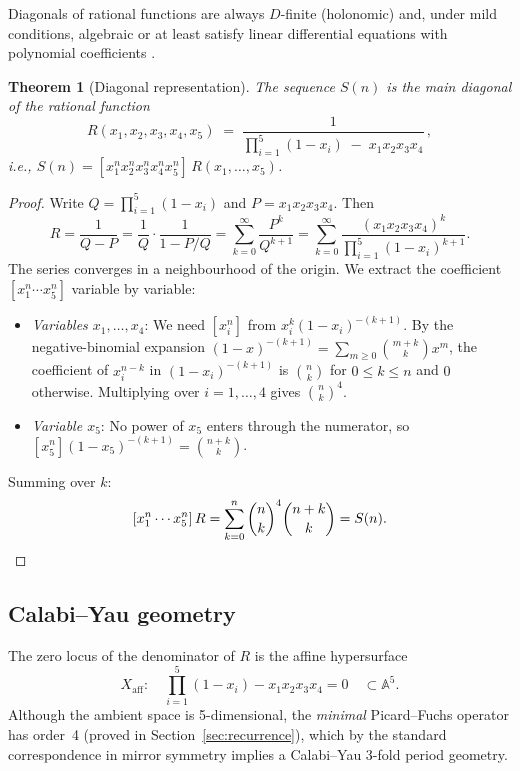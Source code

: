 \documentclass[11pt, a4paper]{article}
\newtheorem{theorem}{Theorem}
\begin{document}
Diagonals of rational functions are always $D$-finite (holonomic) and, under
mild conditions, algebraic or at least satisfy linear differential equations
with polynomial coefficients \cite{LipshitzPoorten1990,Christol1986}.

\begin{theorem}[Diagonal representation]\label{thm:diagonal}
The sequence $S(n)$ is the main diagonal of the rational function
\begin{equation}\label{eq:R}
  R(x_1, x_2, x_3, x_4, x_5)
  \;=\; \frac{1}{\displaystyle\prod_{i=1}^5 (1-x_i) \;-\; x_1 x_2 x_3 x_4}\,,
\end{equation}
i.e., $S(n) = [x_1^n x_2^n x_3^n x_4^n x_5^n]\, R(x_1,\dots,x_5)$.
\end{theorem}

\begin{proof}
Write $Q = \prod_{i=1}^5(1-x_i)$ and $P = x_1x_2x_3x_4$.  Then
\[
  R = \frac{1}{Q-P} = \frac{1}{Q}\cdot\frac{1}{1-P/Q}
    = \sum_{k=0}^\infty \frac{P^k}{Q^{k+1}}
    = \sum_{k=0}^\infty
        \frac{(x_1x_2x_3x_4)^k}{\displaystyle\prod_{i=1}^5(1-x_i)^{k+1}}.
\]
The series converges in a neighbourhood of the origin.  We extract the
coefficient $[x_1^n\cdots x_5^n]$ variable by variable:
\begin{itemize}
    \item \textit{Variables $x_1,\dots,x_4$}: We need $[x_i^n]$ from
          $x_i^k(1-x_i)^{-(k+1)}$.  By the negative-binomial expansion
          $(1-x)^{-(k+1)}=\sum_{m\ge 0}\binom{m+k}{k}x^m$, the coefficient
          of $x_i^{n-k}$ in $(1-x_i)^{-(k+1)}$ is $\binom{n}{k}$ for
          $0\le k\le n$ and $0$ otherwise.  Multiplying over $i=1,\dots,4$
          gives $\binom{n}{k}^4$.
    \item \textit{Variable $x_5$}: No power of $x_5$ enters through the
          numerator, so $[x_5^n](1-x_5)^{-(k+1)} = \binom{n+k}{k}$.
\end{itemize}
Summing over $k$:
\[
  [x_1^n\cdots x_5^n]\,R
  = \sum_{k=0}^n \binom{n}{k}^4\binom{n+k}{k} = S(n).\qedhere
\]
\end{proof}

\subsection{Calabi--Yau geometry}

The zero locus of the denominator of $R$ is the affine hypersurface
\begin{equation}\label{eq:LG}
  X_{\mathrm{aff}}:\quad
  \prod_{i=1}^5(1-x_i) - x_1x_2x_3x_4 = 0
  \quad \subset \mathbb{A}^5.
\end{equation}
Although the ambient space is 5-dimensional, the \emph{minimal}
Picard--Fuchs operator has order~4 (proved in Section~\ref{sec:recurrence}),
which by the standard correspondence in mirror symmetry implies a
Calabi--Yau 3-fold period geometry.
\end{document}
